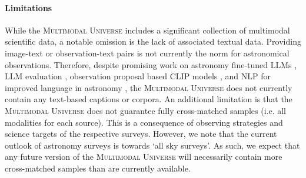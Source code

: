 \documentclass[dvipsnames,table]{article}
\newcommand\pile{\textsc{Multimodal Universe}\xspace}
\newcommand{\FL}[1]{{\color{magenta}FL: #1}}
\begin{document}


\paragraph{Limitations} While the \pile includes a significant collection of multimodal scientific data, a notable omission is the lack of associated textual data. Providing image-text or observation-text pairs is not currently the norm for astronomical observations. Therefore, despite promising work on astronomy fine-tuned LLMs \citep{Nguyen2023AstroLLaMA, tijmen2024cosmosage}, LLM evaluation \citep{wu2024designing}, observation proposal based CLIP models \citep{mishrasharma2024paperclip}, and NLP for improved language in astronomy \citep{Bowles2023SemanticTags, Bowles2022_SemanticTags}, the \pile does not currently contain any text-based captions or corpora.
An additional limitation is that the \pile does not guarantee fully cross-matched samples (i.e. all modalities for each source). This is a consequence of observing strategies and science targets of the respective surveys. However, we note that the current outlook of astronomy surveys is towards `all sky surveys'. As such, we expect that any future version of the \pile will necessarily contain more cross-matched samples than are currently available.
\end{document}
